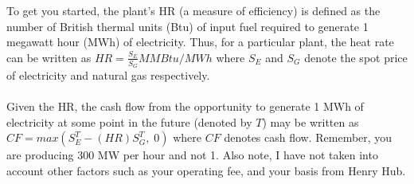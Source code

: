 \documentclass{article}
\begin{document}
To get you started, the plant's HR (a measure of efficiency) is defined as the number of British thermal units (Btu) of input fuel required to generate 1 megawatt hour (MWh) of electricity.  Thus, for a particular plant, the heat rate can be written as $HR=\frac{S_E}{S_G}MMBtu/MWh$ where $S_E$ and $S_G$ denote the spot price of electricity and natural gas respectively. \\
\\
Given the HR, the cash flow from the opportunity to generate 1 MWh of electricity at some point in the future (denoted by $T$) may be written as $CF=max(S^T_E-(HR)S^T_G, \;0)$ where $CF$ denotes cash flow.  Remember, you are producing 300 MW per hour and not 1.  Also note, I have not taken into account other factors such as your operating fee, and your basis from Henry Hub.
\end{document}
